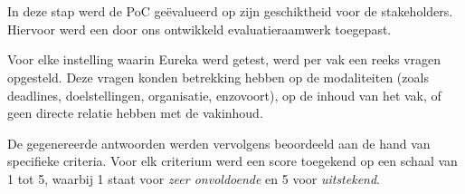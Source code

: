 \section{}%
\label{sec:poc-opzetting}

In deze stap werd de PoC geëvalueerd op zijn geschiktheid voor de stakeholders. Hiervoor werd een door ons ontwikkeld evaluatieraamwerk toegepast.

Voor elke instelling waarin Eureka werd getest, werd per vak een reeks vragen opgesteld. Deze vragen konden betrekking hebben op de modaliteiten (zoals deadlines, doelstellingen, organisatie, enzovoort), op de inhoud van het vak, of geen directe relatie hebben met de vakinhoud.

De gegenereerde antwoorden werden vervolgens beoordeeld aan de hand van specifieke criteria. Voor elk criterium werd een score toegekend op een schaal van 1 tot 5, waarbij 1 staat voor \emph{zeer onvoldoende} en 5 voor \emph{uitstekend}.